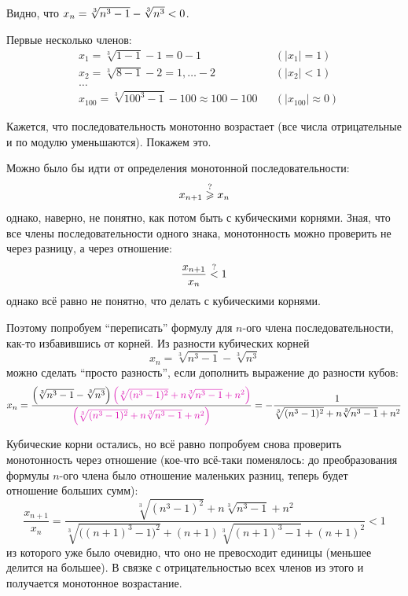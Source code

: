 \documentclass[a4paper,12pt]{article}
\begin{document}
  \begin{solution}
    Видно, что $x_n \hm= \sqrt[3]{n^3 - 1} \hm- \sqrt[3]{n^3} \hm< 0$.
    
    Первые несколько членов:
    \[
      \begin{aligned}
        &x_1 = \sqrt[3]{1 - 1} - 1 = 0 - 1 & &(|x_1| = 1)\\
        &x_2 = \sqrt[3]{8 - 1} - 2 = 1{,}\ldots - 2 & &(|x_2| < 1)\\
        &\ldots\\
        &x_{100} = \sqrt[3]{100^3 - 1} - 100 \approx 100 - 100 & &(|x_{100}| \approx 0)
      \end{aligned}
    \]
    
    Кажется, что последовательность монотонно возрастает (все числа отрицательные и по модулю уменьшаются).
    Покажем это.
    
    Можно было бы идти от определения монотонной последовательности:
    \[
      x_{n + 1} \overset{\operatorname{?}}{\geqslant} x_{n}
    \]
    однако, наверно, не понятно, как потом быть с кубическими корнями.
    Зная, что все члены последовательности одного знака, монотонность можно проверить не через разницу, а через отношение:
    \[
      \frac{x_{n + 1}}{x_n} \overset{\operatorname{?}}{<} 1
    \]
    однако всё равно не понятно, что делать с кубическими корнями.
    
    Поэтому попробуем ``переписать'' формулу для $n$-ого члена последовательности, как-то избавившись от корней.
    Из разности кубических корней
    \[
      x_n = \sqrt[3]{n^3 - 1} - \sqrt[3]{n^3}
    \]
    можно сделать ``просто разность'', если дополнить выражение до разности кубов:
    \[
      x_n = \frac{\left(\sqrt[3]{n^3 - 1} - \sqrt[3]{n^3}\right)\textcolor{pink}{\left(\sqrt[3]{(n^3 - 1)^2} + n \sqrt[3]{n^3 - 1} + n^2\right)}}{\textcolor{pink}{\left(\sqrt[3]{(n^3 - 1)^2} + n \sqrt[3]{n^3 - 1} + n^2\right)}}
          = -\frac{1}{\sqrt[3]{(n^3 - 1)^2} + n \sqrt[3]{n^3 - 1} + n^2}
    \]
    
    Кубические корни остались, но всё равно попробуем снова проверить монотонность через отношение (кое-что всё-таки поменялось: до преобразования формулы $n$-ого члена было отношение маленьких разниц, теперь будет отношение больших сумм):
    \[
      \frac{x_{n + 1}}{x_n} = \frac{\sqrt[3]{(n^3 - 1)^2} + n \sqrt[3]{n^3 - 1} + n^2}{\sqrt[3]{\bigl((n + 1)^3 - 1\bigr)^2} + (n + 1) \sqrt[3]{(n + 1)^3 - 1} + (n + 1)^2} < 1
    \]
    из которого уже было очевидно, что оно не превосходит единицы (меньшее делится на большее).
    В связке с отрицательностью всех членов из этого и получается монотонное возрастание.
  \end{solution}
  
\end{document}
